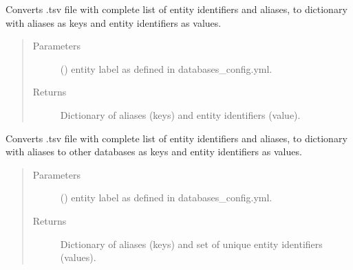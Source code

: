 \documentclass[letterpaper,10pt,english]{sphinxmanual}
\begin{document}

\begin{fulllineitems}
\label{\detokenize{_autosummary/graphdb_builder:graphdb_builder.mapping.getMappingForEntity}}
Converts .tsv file with complete list of entity identifiers and aliases,     to dictionary with aliases as keys and entity identifiers as values.
\begin{quote}\begin{description}
\item[{Parameters}] \leavevmode
{} () \textendash{} entity label as defined in databases\_config.yml.

\item[{Returns}] \leavevmode
Dictionary of aliases (keys) and entity identifiers (value).

\end{description}\end{quote}

\end{fulllineitems}


\begin{fulllineitems}
\label{\detokenize{_autosummary/graphdb_builder:graphdb_builder.mapping.getMultipleMappingForEntity}}
Converts .tsv file with complete list of entity identifiers and aliases,     to dictionary with aliases to other databases as keys and entity identifiers as values.
\begin{quote}\begin{description}
\item[{Parameters}] \leavevmode
{} () \textendash{} entity label as defined in databases\_config.yml.

\item[{Returns}] \leavevmode
Dictionary of aliases (keys) and set of unique entity identifiers (values).

\end{description}\end{quote}

\end{fulllineitems}
\end{document}
